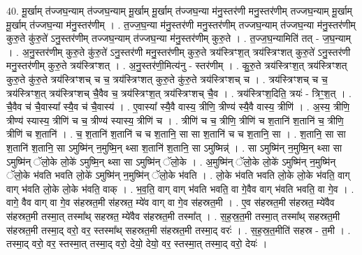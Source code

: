 \documentclass[17pt]{extarticle}
\begin{document}
40. मू॒र्खाम् त॑ज्जघ॒न्याम् त॑ज्जघ॒न्याम् मू॒र्खाम् मू॒र्खाम् त॑ज्जघ॒न्या म॑नु॒स्तर॑णी मनु॒स्तर॑णीम् तज्जघ॒न्याम् मू॒र्खाम् मू॒र्खाम् त॑ज्जघ॒न्या म॑नु॒स्तर॑णीम् । . त॒ज्ज॒घ॒न्या म॑नु॒स्तर॑णी मनु॒स्तर॑णीम् तज्जघ॒न्याम् त॑ज्जघ॒न्या म॑नु॒स्तर॑णीम् कुरु॒ते कु॑रु॒ते॑ ऽनु॒स्तर॑णीम् तज्जघ॒न्याम् त॑ज्जघ॒न्या म॑नु॒स्तर॑णीम् कुरु॒ते । . त॒ज्ज॒घ॒न्यामिति॑ तत् - ज॒घ॒न्याम् । . अ॒नु॒स्तर॑णीम् कुरु॒ते कु॑रु॒ते॑ ऽनु॒स्तर॑णी मनु॒स्तर॑णीम् कुरु॒ते त्रय॑स्त्रिꣳश॒त् त्रय॑स्त्रिꣳशत् कुरु॒ते॑ ऽनु॒स्तर॑णी मनु॒स्तर॑णीम् कुरु॒ते त्रय॑स्त्रिꣳशत् । . अ॒नु॒स्तर॑णी॒मित्य॑नु - स्तर॑णीम् । . कु॒रु॒ते त्रय॑स्त्रिꣳश॒त् त्रय॑स्त्रिꣳशत् कुरु॒ते कु॑रु॒ते त्रय॑स्त्रिꣳशच् च च॒ त्रय॑स्त्रिꣳशत् कुरु॒ते कु॑रु॒ते त्रय॑स्त्रिꣳशच् च । . त्रय॑स्त्रिꣳशच् च च॒ त्रय॑स्त्रिꣳश॒त् त्रय॑स्त्रिꣳशच् चै॒वैव च॒ त्रय॑स्त्रिꣳश॒त् त्रय॑स्त्रिꣳशच् चै॒व । . त्रय॑स्त्रिꣳश॒दिति॒ त्रयः॑ - त्रिꣳ॒॒श॒त् । . चै॒वैव च॑ चै॒वास्या᳚ स्यै॒व च॑ चै॒वास्य॑ । . ए॒वास्या᳚ स्यै॒वै वास्य॒ त्रीणि॒ त्रीण्य॑ स्यै॒वै वास्य॒ त्रीणि॑ । . अ॒स्य॒ त्रीणि॒ त्रीण्य॑ स्यास्य॒ त्रीणि॑ च च॒ त्रीण्य॑ स्यास्य॒ त्रीणि॑ च । . त्रीणि॑ च च॒ त्रीणि॒ त्रीणि॑ च श॒तानि॑ श॒तानि॑ च॒ त्रीणि॒ त्रीणि॑ च श॒तानि॑ । . च॒ श॒तानि॑ श॒तानि॑ च च श॒तानि॒ सा सा श॒तानि॑ च च श॒तानि॒ सा । . श॒तानि॒ सा सा श॒तानि॑ श॒तानि॒ सा ऽमुष्मि॑न् न॒मुष्मि॒न् थ्सा श॒तानि॑ श॒तानि॒ सा ऽमुष्मिन्न्॑ । . सा ऽमुष्मि॑न् न॒मुष्मि॒न् थ्सा सा ऽमुष्मि॑न् ॅलो॒के लो॒के॑ ऽमुष्मि॒न् थ्सा सा ऽमुष्मि॑न् ॅलो॒के । . अ॒मुष्मि॑न् ॅलो॒के लो॒के॑ ऽमुष्मि॑न् न॒मुष्मि॑न् ॅलो॒के भ॑वति भवति लो॒के॑ ऽमुष्मि॑न् न॒मुष्मि॑न् ॅलो॒के भ॑वति । . लो॒के भ॑वति भवति लो॒के लो॒के भ॑वति॒ वाग् वाग् भ॑वति लो॒के लो॒के भ॑वति॒ वाक् । . भ॒व॒ति॒ वाग् वाग् भ॑वति भवति॒ वा गे॒वैव वाग् भ॑वति भवति॒ वा गे॒व । . वागे॒ वैव वाग् वा गे॒व स॑हस्रत॒मी स॑हस्रत॒ म्ये॑व वाग् वा गे॒व स॑हस्रत॒मी । . ए॒व स॑हस्रत॒मी स॑हस्रत॒ म्ये॑वैव स॑हस्रत॒मी तस्मा॒त् तस्मा᳚थ् सहस्रत॒ म्ये॑वैव स॑हस्रत॒मी तस्मा᳚त् । . स॒ह॒स्र॒त॒मी तस्मा॒त् तस्मा᳚थ् सहस्रत॒मी स॑हस्रत॒मी तस्मा॒द् वरो॒ वर॒ स्तस्मा᳚थ् सहस्रत॒मी स॑हस्रत॒मी तस्मा॒द् वरः॑ । . स॒ह॒स्र॒त॒मीति॑ सहस्र - त॒मी । . तस्मा॒द् वरो॒ वर॒ स्तस्मा॒त् तस्मा॒द् वरो॒ देयो॒ देयो॒ वर॒ स्तस्मा॒त् तस्मा॒द् वरो॒ देयः॑ । \newline
\pagebreak
{}
\end{document}
